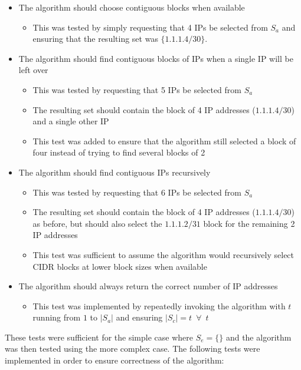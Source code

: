 \begin{itemize}
\item{The algorithm should choose contiguous blocks when available}
      \begin{itemize}
      \item{This was tested by simply requesting that 4 IPs be selected from $S_a$ and ensuring that the resulting set was $\{1.1.1.4/30\}$.}
      \end{itemize}
\item{The algorithm should find contiguous blocks of IPs when a single IP will be left over}
      \begin{itemize}
      \item{This was tested by requesting that 5 IPs be selected from $S_a$}
      \item{The resulting set should contain the block of 4 IP addresses ($1.1.1.4/30$) and a single other IP}
      \item{This test was added to ensure that the algorithm still selected a block of four instead of trying to find several blocks of 2}
      \end{itemize}
\item{The algorithm should find contiguous IPs recursively}
      \begin{itemize}
      \item{This was tested by requesting that 6 IPs be selected from $S_a$}
      \item{The resulting set should contain the block of 4 IP addresses ($1.1.1.4/30$) as before, but should also select the $1.1.1.2/31$ block for the remaining 2 IP addresses}
      \item{This test was sufficient to assume the algorithm would recursively select CIDR blocks at lower block sizes when available}
      \end{itemize}
\item{The algorithm should always return the correct number of IP addresses}
      \begin{itemize}
      \item{This test was implemented by repeatedly invoking the algorithm with $t$ running from $1$ to $|S_a|$ and ensuring $|S_c| = t \enspace \forall \enspace t$}
      \end{itemize}
\end{itemize}

These tests were sufficient for the simple case where $S_e = \{\}$ and the algorithm was then tested using the more complex case. The following tests were implemented in order to ensure correctness of the algorithm:

